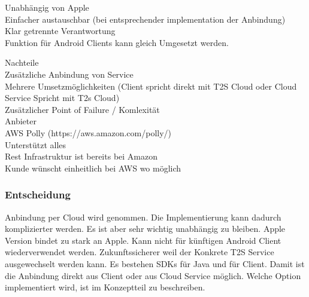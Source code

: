 Unabhängig von Apple \\
Einfacher austauschbar (bei entsprechender implementation der Anbindung) \\
Klar getrennte Verantwortung \\
Funktion für Android Clients kann gleich Umgesetzt werden.

Nachteile \\
Zusätzliche Anbindung von Service \\
Mehrere Umsetzmöglichkeiten (Client spricht direkt mit T2S Cloud oder Cloud Service Spricht mit T2s Cloud) \\
Zusätzlicher Point of Failure / Komlexität \\



Anbieter \\

AWS Polly (https://aws.amazon.com/polly/) \\
Unterstützt alles \\
Rest Infrastruktur ist bereits bei Amazon \\
Kunde wünscht einheitlich bei AWS wo möglich \\


\subsubsection{Entscheidung}

Anbindung per Cloud wird genommen.
Die Implementierung kann dadurch komplizierter werden.
Es ist aber sehr wichtig unabhängig zu bleiben.
Apple Version bindet zu stark an Apple.
Kann nicht für künftigen Android Client wiederverwendet werden.
Zukunftssicherer weil der Konkrete T2S Service ausgewechselt werden kann.
Es bestehen SDKs für Java und für Client.
Damit ist die Anbindung direkt aus Client oder aus Cloud Service möglich.
Welche Option implementiert wird, ist im Konzeptteil zu beschreiben.


\clearpage
